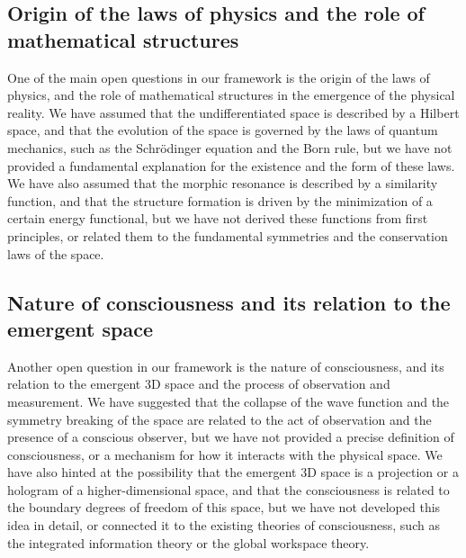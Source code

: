 \subsection{Origin of the laws of physics and the role of mathematical structures}
One of the main open questions in our framework is the origin of the laws of physics, and the role of mathematical structures in the emergence of the physical reality. We have assumed that the undifferentiated space is described by a Hilbert space, and that the evolution of the space is governed by the laws of quantum mechanics, such as the Schrödinger equation and the Born rule, but we have not provided a fundamental explanation for the existence and the form of these laws. We have also assumed that the morphic resonance is described by a similarity function, and that the structure formation is driven by the minimization of a certain energy functional, but we have not derived these functions from first principles, or related them to the fundamental symmetries and the conservation laws of the space.

\subsection{Nature of consciousness and its relation to the emergent space}
Another open question in our framework is the nature of consciousness, and its relation to the emergent 3D space and the process of observation and measurement. We have suggested that the collapse of the wave function and the symmetry breaking of the space are related to the act of observation and the presence of a conscious observer, but we have not provided a precise definition of consciousness, or a mechanism for how it interacts with the physical space. We have also hinted at the possibility that the emergent 3D space is a projection or a hologram of a higher-dimensional space, and that the consciousness is related to the boundary degrees of freedom of this space, but we have not developed this idea in detail, or connected it to the existing theories of consciousness, such as the integrated information theory or the global workspace theory.


